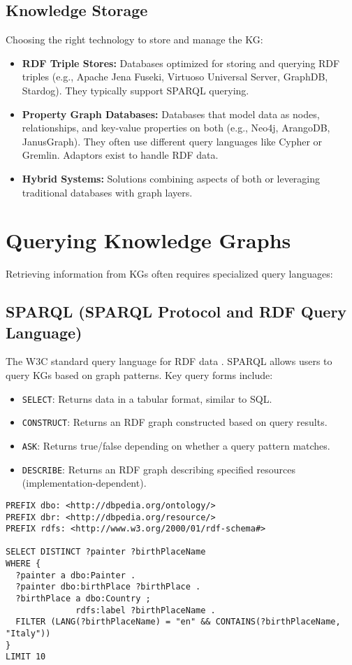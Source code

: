 \documentclass[11pt, a4paper]{article}
\begin{document}
\subsection{Knowledge Storage}
\label{subsec:storage}
Choosing the right technology to store and manage the KG:
\begin{itemize}
    \item \textbf{RDF Triple Stores:} Databases optimized for storing and querying RDF triples (e.g., Apache Jena Fuseki, Virtuoso Universal Server, GraphDB, Stardog). They typically support SPARQL querying.
    \item \textbf{Property Graph Databases:} Databases that model data as nodes, relationships, and key-value properties on both (e.g., Neo4j, ArangoDB, JanusGraph). They often use different query languages like Cypher or Gremlin. Adaptors exist to handle RDF data.
    \item \textbf{Hybrid Systems:} Solutions combining aspects of both or leveraging traditional databases with graph layers.
\end{itemize}

\section{Querying Knowledge Graphs}
\label{sec:querying}

Retrieving information from KGs often requires specialized query languages:

\subsection{SPARQL (SPARQL Protocol and RDF Query Language)}
\label{subsec:sparql}
The W3C standard query language for RDF data \cite{SPARQL11Query}. SPARQL allows users to query KGs based on graph patterns. Key query forms include:
\begin{itemize}
    \item \texttt{SELECT}: Returns data in a tabular format, similar to SQL.
    \item \texttt{CONSTRUCT}: Returns an RDF graph constructed based on query results.
    \item \texttt{ASK}: Returns true/false depending on whether a query pattern matches.
    \item \texttt{DESCRIBE}: Returns an RDF graph describing specified resources (implementation-dependent).
\end{itemize}

\begin{lstlisting}[caption={Example SPARQL query to find painters born in Italy.}, label=lst:sparql_example]
PREFIX dbo: <http://dbpedia.org/ontology/>
PREFIX dbr: <http://dbpedia.org/resource/>
PREFIX rdfs: <http://www.w3.org/2000/01/rdf-schema#>

SELECT DISTINCT ?painter ?birthPlaceName
WHERE {
  ?painter a dbo:Painter .
  ?painter dbo:birthPlace ?birthPlace .
  ?birthPlace a dbo:Country ;
              rdfs:label ?birthPlaceName .
  FILTER (LANG(?birthPlaceName) = "en" && CONTAINS(?birthPlaceName, "Italy"))
}
LIMIT 10
\end{lstlisting}
\end{document}
